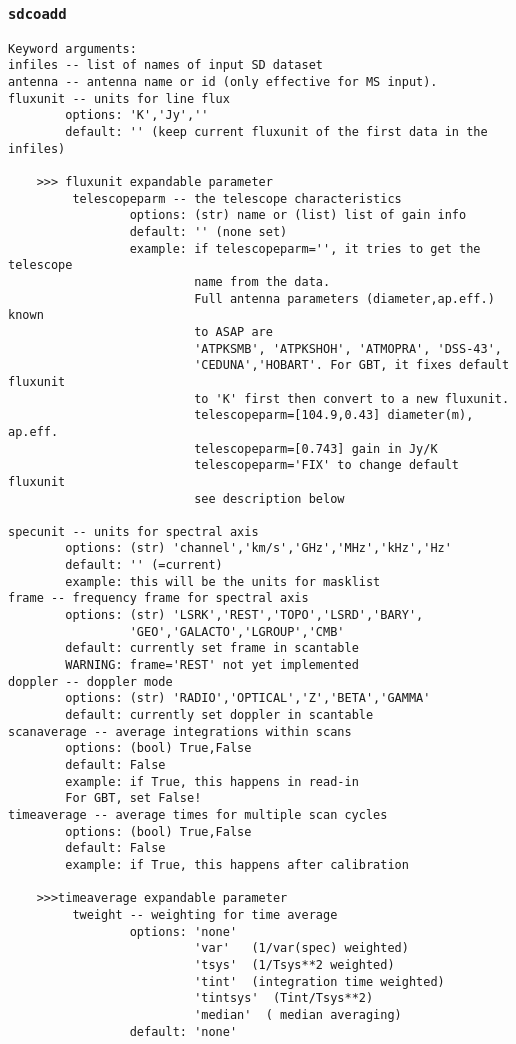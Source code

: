 \subsubsection{{\tt sdcoadd}}
\label{section:sd.sdtasks.tasks.sdcoadd}

\begin{verbatim}
Keyword arguments:
infiles -- list of names of input SD dataset
antenna -- antenna name or id (only effective for MS input). 
fluxunit -- units for line flux
        options: 'K','Jy',''
        default: '' (keep current fluxunit of the first data in the infiles)

    >>> fluxunit expandable parameter
         telescopeparm -- the telescope characteristics
                 options: (str) name or (list) list of gain info
                 default: '' (none set)
                 example: if telescopeparm='', it tries to get the telescope
                          name from the data.
                          Full antenna parameters (diameter,ap.eff.) known
                          to ASAP are
                          'ATPKSMB', 'ATPKSHOH', 'ATMOPRA', 'DSS-43',
                          'CEDUNA','HOBART'. For GBT, it fixes default fluxunit
                          to 'K' first then convert to a new fluxunit.
                          telescopeparm=[104.9,0.43] diameter(m), ap.eff.
                          telescopeparm=[0.743] gain in Jy/K
                          telescopeparm='FIX' to change default fluxunit
                          see description below

specunit -- units for spectral axis
        options: (str) 'channel','km/s','GHz','MHz','kHz','Hz'
        default: '' (=current)
        example: this will be the units for masklist
frame -- frequency frame for spectral axis
        options: (str) 'LSRK','REST','TOPO','LSRD','BARY',
                 'GEO','GALACTO','LGROUP','CMB'
        default: currently set frame in scantable
        WARNING: frame='REST' not yet implemented
doppler -- doppler mode
        options: (str) 'RADIO','OPTICAL','Z','BETA','GAMMA'
        default: currently set doppler in scantable
scanaverage -- average integrations within scans
        options: (bool) True,False
        default: False
        example: if True, this happens in read-in
        For GBT, set False!
timeaverage -- average times for multiple scan cycles
        options: (bool) True,False
        default: False
        example: if True, this happens after calibration

    >>>timeaverage expandable parameter
         tweight -- weighting for time average
                 options: 'none' 
                          'var'   (1/var(spec) weighted)
                          'tsys'  (1/Tsys**2 weighted)
                          'tint'  (integration time weighted)
                          'tintsys'  (Tint/Tsys**2)
                          'median'  ( median averaging)
                 default: 'none'


\end{verbatim}
